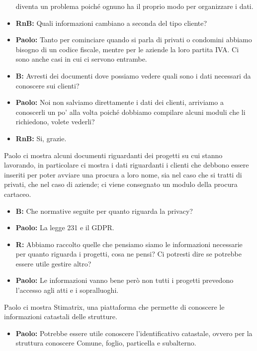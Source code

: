 \documentclass{elegantbook}
\begin{document}
\begin{itemize}
                    diventa un problema poiché ognuno ha il proprio modo per organizzare i dati. 
		\item \textbf{RnB:} Quali informazioni cambiano a seconda del tipo cliente?
		\item \textbf{Paolo:} Tanto per cominciare quando si parla di privati o condomini abbiamo bisogno di un codice fiscale, mentre per le aziende la loro partita IVA. Ci sono anche casi in cui ci servono entrambe.
		\item \textbf{B:} Avresti dei documenti dove possiamo vedere quali sono i dati necessari da conoscere sui clienti?
		\item \textbf{Paolo:} Noi non salviamo direttamente i dati dei clienti, arriviamo a conoscerli un po' alla volta poiché dobbiamo compilare alcuni moduli che 
                    li richiedono, volete vederli?
		\item \textbf{RnB:} Si, grazie.
		\\
	\end{itemize}
	Paolo ci mostra alcuni documenti riguardanti dei progetti su cui stanno lavorando, in particolare ci mostra i dati riguardanti i clienti che debbono essere inseriti per poter avviare una procura a loro nome, sia nel caso che si tratti di privati, che nel caso di aziende; ci viene consegnato un modulo della procura cartaceo.
	\\
	\begin{itemize}
		\item \textbf{B:} Che normative seguite per quanto riguarda la privacy?
		\item \textbf{Paolo:} La legge 231 e il GDPR.
		\item \textbf{R:} Abbiamo raccolto quelle che pensiamo siamo le informazioni necessarie per quanto riguarda i progetti, cosa ne pensi? Ci potresti dire se 
                    potrebbe essere utile gestire altro?
		\item \textbf{Paolo:} Le informazioni vanno bene però non tutti i progetti prevedono l'accesso agli atti e i sopralluoghi.
		\\
	\end{itemize}
	Paolo ci mostra Stimatrix, una piattaforma che permette di conoscere le informazioni catastali delle strutture.
	\\
	\begin{itemize}
		\item\textbf{Paolo:} Potrebbe essere utile conoscere l'identificativo catastale, ovvero per la struttura conoscere Comune, foglio, particella e subalterno.
	\end{itemize}
	\newpage
\end{document}
